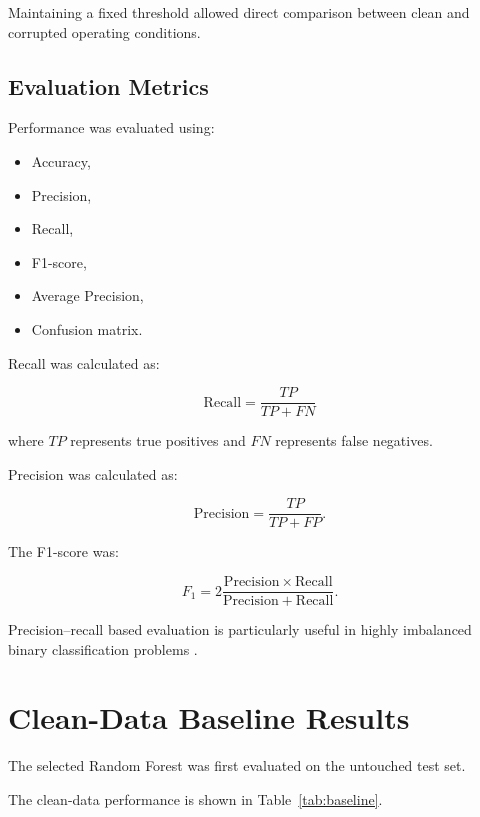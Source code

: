 \documentclass[conference]{IEEEtran}
\begin{document}
Maintaining a fixed threshold allowed direct comparison between clean and corrupted operating conditions.

\subsection{Evaluation Metrics}

Performance was evaluated using:

\begin{itemize}

    \item Accuracy,
    \item Precision,
    \item Recall,
    \item F1-score,
    \item Average Precision,
    \item Confusion matrix.

\end{itemize}

Recall was calculated as:

\[
\mathrm{Recall}
=
\frac{TP}{TP+FN}
\]

where $TP$ represents true positives and $FN$ represents false negatives.

Precision was calculated as:

\[
\mathrm{Precision}
=
\frac{TP}{TP+FP}.
\]

The F1-score was:

\[
F_1 =
2
\frac{
\mathrm{Precision}
\times
\mathrm{Recall}
}{
\mathrm{Precision}
+
\mathrm{Recall}
}.
\]

Precision--recall based evaluation is particularly useful in highly imbalanced binary classification problems \cite{saito2015}.


\section{Clean-Data Baseline Results}

The selected Random Forest was first evaluated on the untouched test set.

The clean-data performance is shown in Table~\ref{tab:baseline}.
\end{document}

